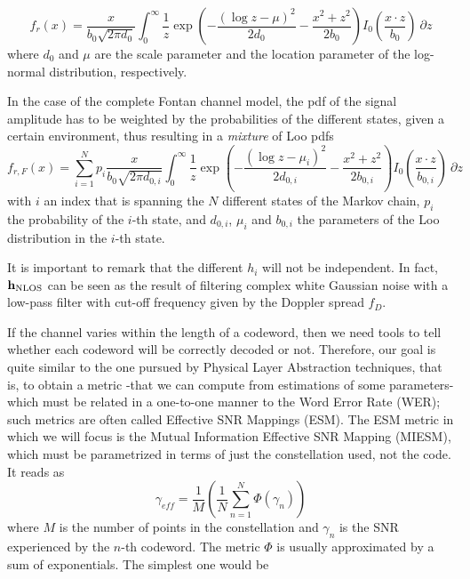 \documentclass[journal,onecolumn,10pt,a4paper]{IEEEtran}
\def\h{{\mathbf h}}
\begin{document}
\begin{equation}
 f_r(x) = \frac{x}{b_0\sqrt{2\pi d_0}}\int_0^\infty\frac{1}{z}\exp\left(-\frac{(\log z-\mu)^2}{2d_0}-\frac{x^2+z^2}{2b_0}\right) I_0\left(\frac{x\cdot z}{b_0}\right)\ \partial z
\end{equation}
where $d_0$ and $\mu$ are the scale parameter and the location parameter of the log-normal distribution, respectively.

In the case of the complete Fontan channel model, the pdf of the signal amplitude has to be weighted by the probabilities of the different states, given a certain environment, thus resulting in a \textit{mixture} of Loo pdfs
\begin{equation}
\label{e:looMixture}
 f_{r,F}(x) = \sum_{i=1}^N p_i \frac{x}{b_0\sqrt{2\pi d_{0,i}}}\int_0^\infty\frac{1}{z}\exp\left(-\frac{(\log z-\mu_i)^2}{2d_{0,i}}-\frac{x^2+z^2}{2b_{0,i}}\right) I_0\left(\frac{x\cdot z}{b_{0,i}}\right)\ \partial z
\end{equation}
with $i$ an index that is spanning the $N$ different states of the Markov chain, $p_i$ the probability of the $i$-th state, and $d_{0,i}$, $\mu_i$ and $b_{0,i}$ the parameters of the Loo distribution in the $i$-th state.

It is important to remark that the different $h_i$ will not be independent. In fact, $\h_{\textnormal{NLOS}}$ can be seen as the result of filtering complex white Gaussian noise with a low-pass filter with cut-off frequency given by the Doppler spread $f_D$. 


If the channel varies within the length of a codeword, then we need tools to tell whether each codeword will be correctly decoded or not. Therefore, our goal is quite similar to the one pursued by Physical Layer Abstraction techniques, that is, to obtain a metric -that we can compute from estimations of some parameters- which must be related in a one-to-one manner to the Word Error Rate (WER); such metrics are often called Effective SNR Mappings (ESM). The ESM metric in which we will focus is the Mutual Information Effective SNR Mapping (MIESM)\cite{link_performance}, which must be parametrized in terms of just the constellation used, not the code. It reads as
\begin{equation}
  \gamma_{eff} = \frac{1}{M}\left( \frac{1}{N}\sum_{n=1}^N\Phi\left(\gamma_n\right)\right)
\end{equation}
where $M$ is the number of points in the constellation and $\gamma_n$ is the SNR experienced by the $n$-th codeword. The metric $\Phi$ is usually approximated by a sum of exponentials. The simplest one would be
\end{document}
